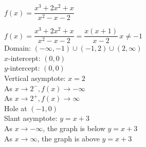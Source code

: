 {$f(x) = \dfrac{x^3+2x^2+x}{x^2-x-2}$}
{$f(x) = \dfrac{x^3+2x^2+x}{x^{2} -x-2} = \dfrac{x(x+1)}{x - 2} \, x \neq -1$\\
Domain: $(-\infty, -1) \cup (-1, 2) \cup (2, \infty)$\\
$x$-intercept:  $(0,0)$\\
$y$-intercept:  $(0,0)$\\
Vertical asymptote: $x = 2$\\
As $x \rightarrow 2^{-}, f(x) \rightarrow -\infty$\\
As $x \rightarrow 2^{+}, f(x) \rightarrow \infty$\\
Hole at $(-1,0)$ \\
Slant asymptote: $y = x+3$ \\
As $x \rightarrow -\infty$, the graph is below $y=x+3$ \\
As $x \rightarrow \infty$, the graph is above $y=x+3$

\begin{center}
\end{center}}